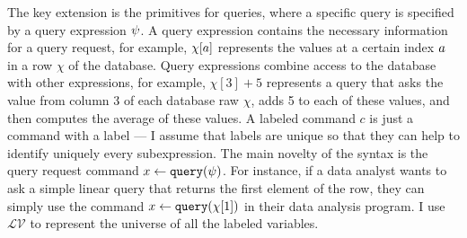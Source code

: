 The key extension is
the primitives for queries, where a specific query is specified by a query expression $\psi$. 
A query expression contains the necessary information for a query request, 
for example, $\chi[a]$ represents the values at a certain index $a$ in a row $\chi$ of the database. 
Query expressions combine access to the database with other expressions, 
for example, $\chi[3] + 5$ represents a query that asks the value from column 3 of each database raw $\chi$, 
adds 5 to each of these values, and then computes the average of these values.
% 
%
 A labeled command $c$ is just a command with a label --- I assume that labels are unique so that they can help to identify uniquely every subexpression. 
 The main novelty of the syntax is the query request command $\mathrel{ x \leftarrow {\tt query}(\psi) }$. 
 For instance, if a data analyst wants to ask a simple linear query that returns the first element of the row, 
 they can simply use the command $ \mathrel{ x \leftarrow {\tt query}(\chi[1]) }$ in their data analysis program.
%
I use 
$\mathcal{LV}$ to represent the universe of all the labeled variables.
 